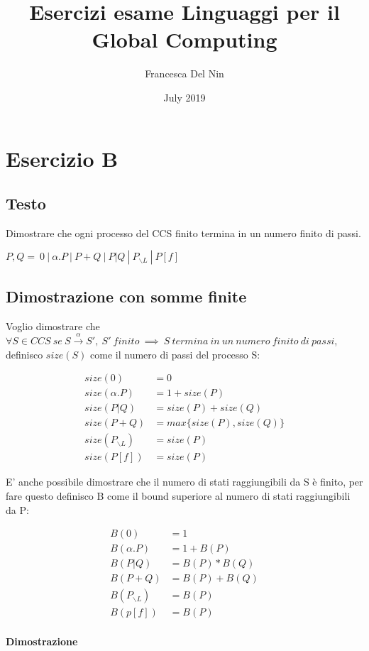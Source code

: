 \documentclass{article}
\title{Esercizi esame Linguaggi per il Global Computing}
\author{Francesca Del Nin}
\date{July 2019}
\newcommand{\pl}{P_{\backslash L}}
\begin{document}
\maketitle

\section{Esercizio B}
\subsection{Testo}

Dimostrare che ogni processo del CCS finito termina in un numero finito di passi.
\begin{center}
    $P, Q = ~0 ~|~ \alpha .P~|~ P+Q~|~ P|Q ~ | ~P_{\backslash L}~|~P[f] $
\end{center}

\subsection{Dimostrazione con somme finite}
Voglio dimostrare che  $\forall S \in CCS~  se ~ S \xrightarrow{\alpha}  S', ~S'~  finito ~ \implies  ~ S ~ termina~  in~  un~  numero~  finito ~ di~  passi$, definisco $size(S)$ come il numero di passi del processo S:

\begin{align*}
size(0) &= 0 \\
size(\alpha.P) &= 1+size(P)\\
size(P|Q) &= size(P)+size(Q)\\
size(P+Q) &= max\{size(P), size(Q)\}\\
size(P_{\backslash L}) &= size(P)\\
size(P[f]) &= size(P)
\end{align*}

E' anche possibile dimostrare che il numero di stati raggiungibili da S è finito, per fare questo definisco B come il bound superiore al numero di stati raggiungibili da P:

\begin{align*}
B(0) &= 1\\
B(\alpha.P) &= 1 + B(P)\\
B(P|Q) &= B(P) * B(Q)\\
B(P+Q) &= B(P) + B(Q)\\
B(\pl) &=  B(P)\\
B(p[f]) &=  B(P)
\end{align*}

\paragraph{Dimostrazione} %
\end{document}
